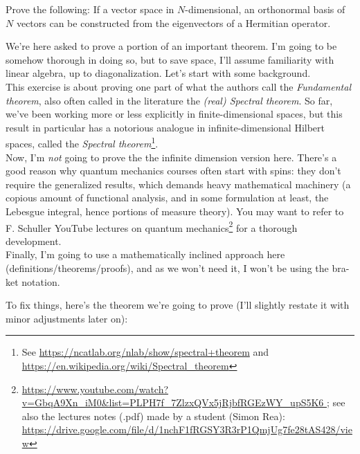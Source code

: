 \documentclass[solutions.tex]{subfiles}
\begin{document}
\maketitle
\begin{exercise}
Prove the following: If a vector space in $N$-dimensional, an
orthonormal basis of $N$ vectors can be constructed from the eigenvectors
of a Hermitian operator.
\end{exercise}

We're here asked to prove a portion of an important theorem. I'm
going to be somehow thorough in doing so, but to save space,
I'll assume familiarity with linear algebra, up to diagonalization.
Let's start with some background. \\

This exercise is about proving one part of what the authors call the
\textit{Fundamental theorem}, also often called in the literature the
\textit{(real) Spectral theorem}. So far, we've been working more or
less explicitly in finite-dimensional spaces, but this result in
particular has a notorious analogue in infinite-dimensional Hilbert
spaces, called the \textit{Spectral theorem}\footnote{See \url{
https://ncatlab.org/nlab/show/spectral+theorem} and \url{
https://en.wikipedia.org/wiki/Spectral_theorem}}. \\

Now, I'm \textit{not} going to prove the the infinite dimension
version here. There's a good reason why quantum mechanics courses
often start with spins: they don't require the generalized
results, which demands heavy mathematical machinery (a copious
amount of functional analysis, and in some formulation at least,
the Lebesgue integral, hence portions of measure theory).
You may want to refer to F. Schuller YouTube lectures on
quantum mechanics\footnote{\url{
https://www.youtube.com/watch?v=GbqA9Xn_iM0&list=PLPH7f_7ZlzxQVx5jRjbfRGEzWY_upS5K6
}; see also the lectures notes (.pdf) made by a student (Simon Rea):
\url{https://drive.google.com/file/d/1nchF1fRGSY3R3rP1QmjUg7fe28tAS428/view}}
for a thorough development. \\

Finally, I'm going to use a mathematically inclined approach
here (definitions/theorems/proofs), and as we won't need
it, I won't be using the bra-ket notation.

\hrr

To fix things, here's the theorem we're going to prove (I'll slightly
restate it with minor adjustments later on):
\end{document}
